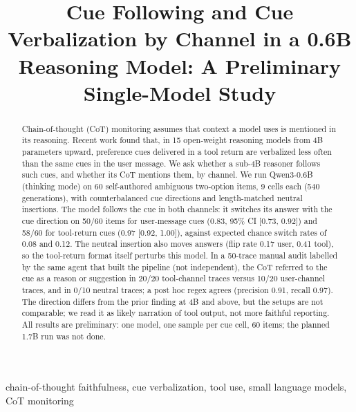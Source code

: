 \documentclass[conference]{IEEEtran}
\begin{document}
\title{Cue Following and Cue Verbalization by Channel in a 0.6B Reasoning Model: A Preliminary Single-Model Study}

\author{}

\maketitle

\begin{abstract}
Chain-of-thought (CoT) monitoring assumes that context a model uses is mentioned in its reasoning. Recent work found that, in 15 open-weight reasoning models from 4B parameters upward, preference cues delivered in a tool return are verbalized less often than the same cues in the user message. We ask whether a sub-4B reasoner follows such cues, and whether its CoT mentions them, by channel. We run Qwen3-0.6B (thinking mode) on 60 self-authored ambiguous two-option items, 9 cells each (540 generations), with counterbalanced cue directions and length-matched neutral insertions. The model follows the cue in both channels: it switches its answer with the cue direction on 50/60 items for user-message cues (0.83, 95\% CI [0.73, 0.92]) and 58/60 for tool-return cues (0.97 [0.92, 1.00]), against expected chance switch rates of 0.08 and 0.12. The neutral insertion also moves answers (flip rate 0.17 user, 0.41 tool), so the tool-return format itself perturbs this model. In a 50-trace manual audit labelled by the same agent that built the pipeline (not independent), the CoT referred to the cue as a reason or suggestion in 20/20 tool-channel traces versus 10/20 user-channel traces, and in 0/10 neutral traces; a post hoc regex agrees (precision 0.91, recall 0.97). The direction differs from the prior finding at 4B and above, but the setups are not comparable; we read it as likely narration of tool output, not more faithful reporting. All results are preliminary: one model, one sample per cue cell, 60 items; the planned 1.7B run was not done.
\end{abstract}

\begin{IEEEkeywords}
chain-of-thought faithfulness, cue verbalization, tool use, small language models, CoT monitoring
\end{IEEEkeywords}
\end{document}
